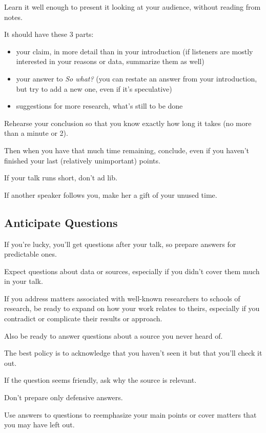 \documentclass[oneside]{book}
\numberwithin{equation}{section}
\begin{document}
Learn it well enough to present it looking at your audience, without reading from notes.

It should have these 3 parts:
\begin{itemize}
    \item your claim, in more detail than in your introduction (if listeners are mostly interested in your reasons or data, summarize them as well)
    \item your answer to \textit{So what?} (you can restate an answer from your introduction, but try to add a new one, even if it's speculative)
    \item suggestions for more research, what's still to be done
\end{itemize}
Rehearse your conclusion so that you know exactly how long it takes (no more than a minute or 2).

Then when you have that much time remaining, conclude, even if you haven't finished your last (relatively unimportant) points.


If your talk runs short, don't ad lib.

If another speaker follows you, make her a gift of your unused time.

\subsection{Anticipate Questions}
If you're lucky, you'll get questions after your talk, so prepare answers for predictable ones.

Expect questions about data or sources, especially if you didn't cover them much in your talk.

If you address matters associated with well-known researchers to schools of research, be ready to expand on how your work relates to theirs, especially if you contradict or complicate their results or approach.

Also be ready to answer questions about a source you never heard of.

The best policy is to acknowledge that you haven't seen it but that you'll check it out.

If the question seems friendly, ask why the source is relevant.

Don't prepare only defensive answers.

Use answers to questions to reemphasize your main points or cover matters that you may have left out.
\end{document}

